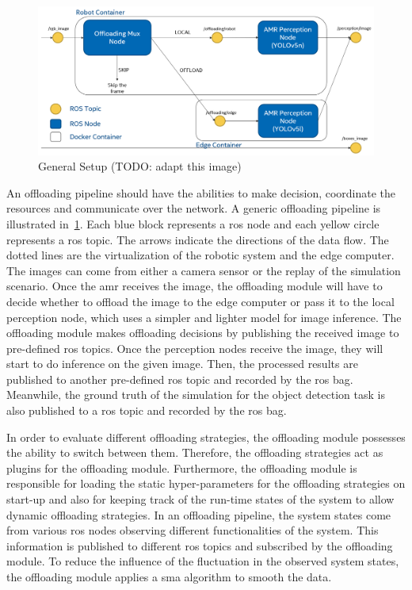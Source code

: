 \begin{figure}[htp]
    \centering
    \includegraphics[width=120mm]{figures/setup/general_setup.png}
    \caption{General Setup (TODO: adapt this image)}
    \label{fig:general_setup}
\end{figure}

An offloading pipeline should have the abilities to make decision, coordinate the resources and communicate over the network. A generic offloading pipeline is illustrated in~\cref{fig:general_setup}. Each blue block represents a \gls{ros} node and each yellow circle represents a \gls{ros} topic. The arrows indicate the directions of the data flow. The dotted lines are the virtualization of the robotic system and the edge computer. The images can come from either a camera sensor or the replay of the simulation scenario. Once the \gls{amr} receives the image, the offloading module will have to decide whether to offload the image to the edge computer or pass it to the local perception node, which uses a simpler and lighter model for image inference. The offloading module makes offloading decisions by publishing the received image to pre-defined \gls{ros} topics. Once the perception nodes receive the image, they will start to do inference on the given image. Then, the processed results are published to another pre-defined \gls{ros} topic and recorded by the \gls{ros} bag. Meanwhile, the ground truth of the simulation for the object detection task is also published to a \gls{ros} topic and recorded by the \gls{ros} bag. 

In order to evaluate different offloading strategies, the offloading module possesses the ability to switch between them. Therefore, the offloading strategies act as plugins for the offloading module. Furthermore, the offloading module is responsible for loading the static hyper-parameters for the offloading strategies on start-up and also for keeping track of the run-time states of the system to allow dynamic offloading strategies. In an offloading pipeline, the system states come from various \gls{ros} nodes observing different functionalities of the system. This information is published to different \gls{ros} topics and subscribed by the offloading module. To reduce the influence of the fluctuation in the observed system states, the offloading module applies a \gls{sma} algorithm to smooth the data. 


